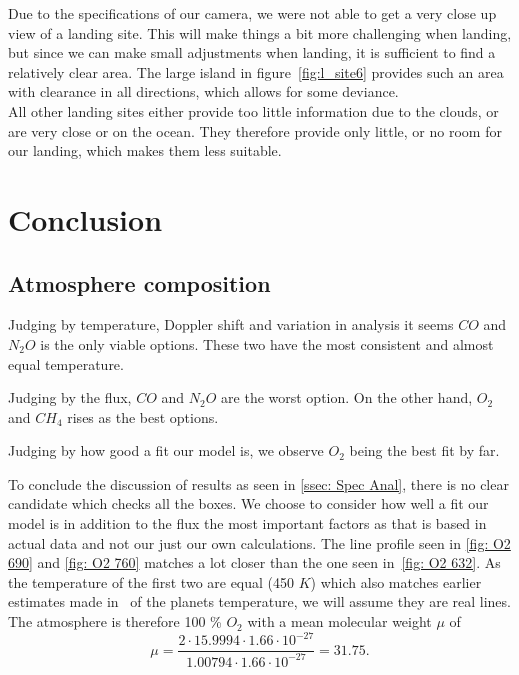 \documentclass[reprint,english,notitlepage]{revtex4-2}
\begin{document}
    Due to the specifications of our camera, we were not able to get a very close up view of a landing site.
    This will make things a bit more challenging when landing, but since we can make small adjustments when landing, it is sufficient to find a relatively clear area.
    The large island in figure~\ref{fig:l_site6} provides such an area with clearance in all directions, which allows for some deviance.\\

    All other landing sites either provide too little information due to the clouds, or are very close or on the ocean.
    They therefore provide only little, or no room for our landing, which makes them less suitable.



\section{Conclusion} \label{sec: conclusion}
\subsection{Atmosphere composition} \label{ssec: Atmpos Comp}
Judging by temperature, Doppler shift and variation in analysis it seems $ CO $ and $ N_2O $ is the only viable options.
These two have the most consistent and almost equal temperature.

Judging by the flux, $ CO $ and $ N_2O  $ are the worst option.
On the other hand, $ O_2 $ and $ CH_4 $ rises as the best options.

Judging by how good a fit our model is, we observe $ O_2 $ being the best fit by far. 

To conclude the discussion of results as seen in \ref{ssec: Spec Anal}, there is no clear candidate which checks all the boxes.
We choose to consider how well a fit our model is in addition to the flux the most important factors as that is based in actual data and not our just our own calculations.
The line profile seen in \ref{fig: O2 690} and \ref{fig: O2 760} matches a lot closer than the one seen in~\ref{fig: O2 632}.
As the temperature of the first two are equal (450 $ K $) which also matches earlier estimates made in~\parencite[][]{part3}
of the planets temperature, we will assume they are real lines.
The atmosphere is therefore 100 \% $ O_2 $ with a mean molecular weight $ \mu $ of
\[
\mu =   \frac{2 ⋅ 15.9994 ⋅  1.66 ⋅ 10^{-27}}{1.00794 ⋅ 1.66  ⋅  10^{-27}} = 31.75.
\]
\end{document}
